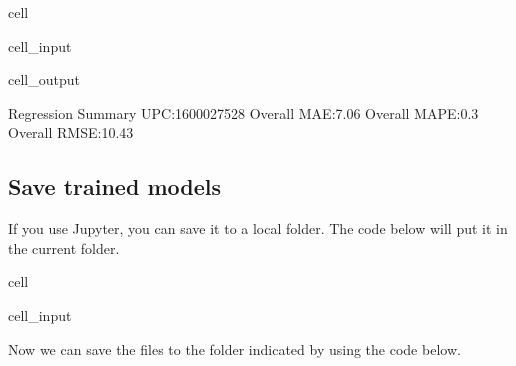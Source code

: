 \documentclass[letterpaper,10pt,english]{jupyterBook}
\begin{document}
\begin{sphinxuseclass}{cell}
\begin{sphinxVerbatimInput}
\begin{sphinxuseclass}{cell_input}
\end{sphinxuseclass}\end{sphinxVerbatimInput}
\begin{sphinxVerbatimOutput}

\begin{sphinxuseclass}{cell_output}
\begin{sphinxVerbatim}[commandchars=\\\{\}]
Regression Summary \PYGZhy{} UPC:1600027528
Overall MAE:7.06
Overall MAPE:0.3
Overall RMSE:10.43
\end{sphinxVerbatim}

\end{sphinxuseclass}\end{sphinxVerbatimOutput}

\end{sphinxuseclass}

\subsection{Save trained models}
\label{\detokenize{docs/Case1_1_Simple_Retail_Demand_Model:save-trained-models}}
\sphinxAtStartPar
If you use Jupyter, you can save it to a local folder. The code below will put it in the current folder.

\begin{sphinxuseclass}{cell}\begin{sphinxVerbatimInput}

\begin{sphinxuseclass}{cell_input}
\begin{sphinxVerbatim}[commandchars=\\\{\}]
  
\end{sphinxVerbatim}

\end{sphinxuseclass}\end{sphinxVerbatimInput}

\end{sphinxuseclass}
\sphinxAtStartPar
Now we can save the files to the folder indicated by using the code below.
\end{document}
